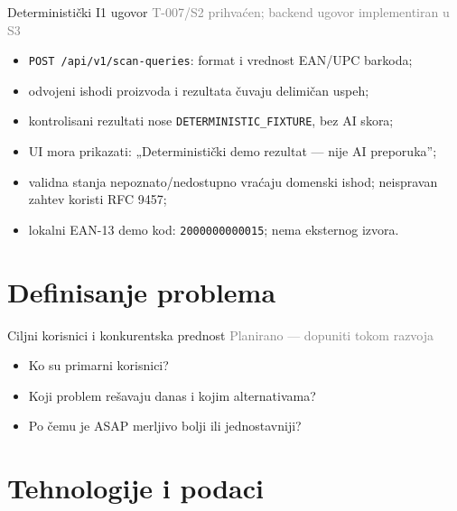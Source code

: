 \documentclass[aspectratio=169,11pt]{beamer}
\newcommand{\planned}{\textcolor{gray}{\footnotesize Planirano --- dopuniti tokom razvoja}}
\begin{document}
\begin{frame}{Deterministički I1 ugovor}
  \textcolor{gray}{\footnotesize T-007/S2 prihvaćen; backend ugovor implementiran u S3}
  \begin{itemize}
    \item \texttt{POST /api/v1/scan-queries}: format i vrednost EAN/UPC barkoda;
    \item odvojeni ishodi proizvoda i rezultata čuvaju delimičan uspeh;
    \item kontrolisani rezultati nose \texttt{DETERMINISTIC\_FIXTURE}, bez AI skora;
    \item UI mora prikazati: „Deterministički demo rezultat --- nije AI preporuka”;
    \item validna stanja nepoznato/nedostupno vraćaju domenski ishod; neispravan zahtev koristi RFC 9457;
    \item lokalni EAN-13 demo kod: \texttt{2000000000015}; nema eksternog izvora.
  \end{itemize}
\end{frame}

\section{Definisanje problema}

\begin{frame}{Ciljni korisnici i konkurentska prednost}
  \planned
  \begin{itemize}
    \item Ko su primarni korisnici?
    \item Koji problem rešavaju danas i kojim alternativama?
    \item Po čemu je ASAP merljivo bolji ili jednostavniji?
  \end{itemize}
\end{frame}

\section{Tehnologije i podaci}
\end{document}
